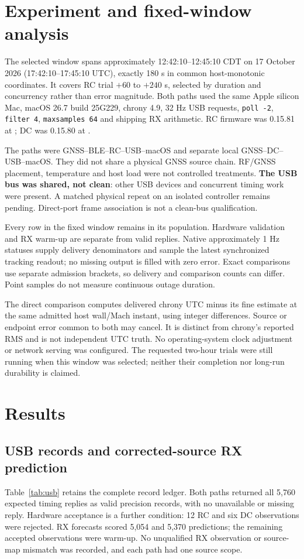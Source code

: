 \documentclass[11pt,letterpaper]{article}
\newcommand{\code}[1]{\texttt{#1}}\newcolumntype{L}[1]{>{\RaggedRight\arraybackslash}p{#1}}
\begin{document}
\section{Experiment and fixed-window analysis}
The selected window spans approximately 12:42:10--12:45:10 CDT on 17 October 2026 (17:42:10--17:45:10 UTC), exactly 180 s in common host-monotonic coordinates. It covers RC trial $+60$ to $+240$ s, selected by duration and concurrency rather than error magnitude. Both paths used the same Apple silicon Mac, macOS 26.7 build 25G229, chrony 4.9, 32 Hz USB requests, \code{poll -2}, \code{filter 4}, \code{maxsamples 64} and shipping RX arithmetic. RC firmware was 0.15.81 at ; DC was 0.15.80 at  \cite{evidence}.

The paths were GNSS--BLE--RC--USB--macOS and separate local GNSS--DC--USB--macOS. They did not share a physical GNSS source chain. RF/GNSS placement, temperature and host load were not controlled treatments. \textbf{The USB bus was shared, not clean}: other USB devices and concurrent timing work were present. A matched physical repeat on an isolated controller remains pending. Direct-port frame association is not a clean-bus qualification.

Every row in the fixed window remains in its population. Hardware validation and RX warm-up are separate from valid replies. Native approximately 1 Hz statuses supply delivery denominators and sample the latest synchronized tracking readout; no missing output is filled with zero error. Exact comparisons use separate admission brackets, so delivery and comparison counts can differ. Point samples do not measure continuous outage duration.

The direct comparison computes delivered chrony UTC minus its fine estimate at the same admitted host wall/Mach instant, using integer differences. Source or endpoint error common to both may cancel. It is distinct from chrony's reported RMS and is not independent UTC truth. No operating-system clock adjustment or network serving was configured. The requested two-hour trials were still running when this window was selected; neither their completion nor long-run durability is claimed.

\section{Results}
\subsection{USB records and corrected-source RX prediction}
Table~\ref{tab:usb} retains the complete record ledger. Both paths returned all 5,760 expected timing replies as valid precision records, with no unavailable or missing reply. Hardware acceptance is a further condition: 12 RC and six DC observations were rejected. RX forecasts scored 5,054 and 5,370 predictions; the remaining accepted observations were warm-up. No unqualified RX observation or source-map mismatch was recorded, and each path had one source scope.
\end{document}
